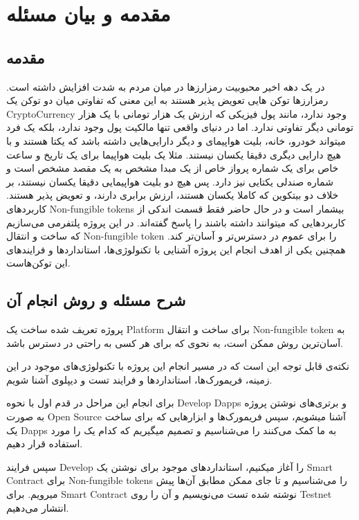 
\chapter{مقدمه و بیان مسئله}

\section{مقدمه}
در یک دهه اخیر محبوبیت رمزارز‌ها در میان مردم به شدت افزایش داشته است. رمزارزها توکن هایی تعویض پذیر هستند به این معنی که تفاوتی میان دو توکن یک
\gls{CryptoCurrency}
وجود ندارد، مانند پول فیزیکی که ارزش یک هزار تومانی با یک هزار تومانی دیگر تفاوتی ندارد.
اما در دنیای واقعی تنها مالکیت پول وجود ندارد، بلکه یک فرد میتواند خودرو، خانه، بلیت هواپیمای و دیگر دارایی‌هایی داشته باشد که یکتا هستند و با هیچ دارایی دیگری دقیقا یکسان نیستند. مثلا یک بلیت هواپیما برای یک تاریخ و ساعت خاص برای یک شماره پرواز خاص از یک مبدا مشخص به یک مقصد مشخص است و شماره صندلی یکتایی نیز دارد. پس هیچ دو بلیت هواپیمایی دقیقا یکسان نیستند، بر خلاف دو بیتکوین که کاملا یکسان هستند، ارزش برابری دارند، و تعویض پذیر هستند.
کاربردهای
\glspl{Non-fungible token}
بیشمار است و در حال حاضر فقط قسمت اندکی از کاربردهایی که میتوانند داشته باشند را پاسخ گفته‌اند. در این پروژه پلتفرمی می‌سازیم که ساخت و انتقال
\gls{Non-fungible token}
را برای عموم در دسترس‌تر و آسان‌تر کند. همچنین یکی از اهدف انجام این پروژه آشنایی با تکنولوژی‌ها، استاندارد‌ها و فرایند‌های این توکن‌هاست.

\section{شرح مسئله و روش انجام آن}
پروژه تعریف شده ساخت یک
\gls{Platform}
برای ساخت و انتقال
\gls{Non-fungible token}
به آسان‌ترین روش ممکن است، به نحوی که برای هر کسی به راحتی در دسترس باشد.

نکته‌ی قابل توجه‌ این است که در مسیر انجام این پروژه با تکنولوژی‌های موجود در این زمینه، فریمورک‌ها، استاندارد‌ها و فرایند تست و دیپلوی آشنا شویم.

برای انجام این مراحل در قدم اول با نحوه
\gls{Develop}
\glspl{Dapp}
و برتری‌های نوشتن پروژه به صورت
\gls{Open Source}
آشنا میشویم، سپس فریمورک‌ها و ابزار‌هایی که برای ساخت یک
\glspl{Dapp}
به ما کمک می‌کنند را می‌شناسیم و تصمیم میگیریم که کدام‌ یک را مورد استفاده قرار دهیم.

سپس فرایند
\gls{Develop}
را آغاز میکنیم، استاندارد‌های موجود برای نوشتن یک
\gls{Smart Contract}
برای
\glspl{Non-fungible token}
را می‌شناسیم و تا جای ممکن مطابق آن‌ها پیش میرویم. برای
\gls{Smart Contract}
نوشته شده تست می‌نویسیم و آن را روی
\gls{Testnet}
انتشار می‌دهیم.

